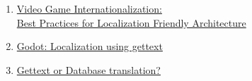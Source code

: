 \begin{enumerate}
\item \href{https://daydigital.com/video-game-internationalization-best-practices}{Video Game Internationalization:\\Best Practices for Localization Friendly Architecture}

\item \href{https://docs.godotengine.org/en/latest/tutorials/i18n/localization_using_gettext.html}{Godot: Localization using gettext}

\item \href{https://stackoverflow.com/a/15343103/14377142}{Gettext or Database translation?}
\end{enumerate}